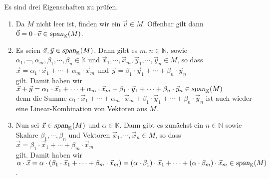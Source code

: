 \proof
Es sind drei Eigenschaften zu pr\"{u}fen.
\begin{enumerate}
\item Da $M$ nicht leer ist, finden wir ein $\vec{v} \in M$.  Offenbar gilt dann
      \\[0.2cm]
      \hspace*{1.3cm}
      $\vec{0} = 0 \cdot \vec{v} \in \textsl{span}_\mathbb{K}(M)$.      
\item Es seien $\vec{x}, \vec{y} \in \textsl{span}_\mathbb{K}(M)$.  Dann gibt es $m,n \in \mathbb{N}$,
      sowie $\alpha_1, \cdots, \alpha_m, \beta_1, \cdots, \beta_n \in \mathbb{K}$ und
      $\vec{x}_1, \cdots, \vec{x}_m, \vec{y}_1, \cdots, \vec{y}_n \in M$, so dass 
      \\[0.2cm]
      \hspace*{1.3cm}
      $\vec{x} = \alpha_1 \cdot \vec{x}_1 + \cdots + \alpha_m \cdot \vec{x}_m$ \quad und \quad
      $\vec{y} = \beta_1 \cdot \vec{y}_1 + \cdots + \beta_n \cdot \vec{y}_n$ 
      \\[0.2cm]
      gilt. Damit haben wir
      \\[0.2cm]
      \hspace*{1.3cm}
      $
       \vec{x} + \vec{y} =  
          \alpha_1 \cdot \vec{x}_1 + \cdots + \alpha_m \cdot \vec{x}_m +
          \beta_1 \cdot \vec{y}_1 + \cdots + \beta_n \cdot \vec{y}_n \in \textsl{span}_\mathbb{K}(M)
      $
      \\[0.2cm]
      denn die Summe 
      $\alpha_1 \cdot \vec{x}_1 + \cdots + \alpha_m \cdot \vec{x}_m + \beta_1 \cdot \vec{y}_1 + \cdots + \beta_n \cdot \vec{y}_n$
      ist auch wieder eine Linear-Kombination von Vektoren aus $M$.
\item Nun sei $\vec{x} \in \textsl{span}_\mathbb{K}(M)$ und $\alpha \in \mathbb{K}$.
      Dann gibt es zun\"{a}chst ein $n \in \mathbb{N}$ sowie Skalare $\beta_1, \cdots, \beta_n$
      und Vektoren $\vec{x}_1, \cdots, \vec{x}_n \in M$, so dass
      \\[0.2cm]
      \hspace*{1.3cm}
      $\vec{x} = \beta_1 \cdot \vec{x}_1 + \cdots + \beta_m \cdot \vec{x}_m$
      \\[0.2cm]
      gilt.  Damit haben wir
      \\[0.2cm]
      \hspace*{1.3cm}
      $\alpha \cdot \vec{x} = \alpha \cdot (\beta_1 \cdot \vec{x}_1 + \cdots + \beta_m \cdot \vec{x}_m) =
       (\alpha \cdot \beta_1) \cdot \vec{x}_1 + \cdots + (\alpha \cdot \beta_m) \cdot \vec{x}_m \in
       \textsl{span}_\mathbb{K}(M)$.
      \qeds
\end{enumerate}


